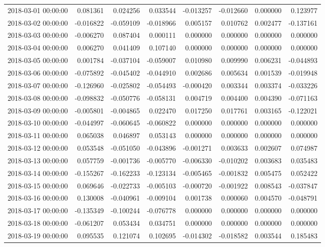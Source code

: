 \begin{tabular}{lrrrrrrr}
2018-03-01 00:00:00 & 0.081361 & 0.024256 & 0.033544 & -0.013257 & -0.012660 & 0.000000 & 0.123977 \\
2018-03-02 00:00:00 & -0.016822 & -0.059109 & -0.018966 & 0.005157 & 0.010762 & 0.002477 & -0.137161 \\
2018-03-03 00:00:00 & -0.006270 & 0.087404 & 0.000111 & 0.000000 & 0.000000 & 0.000000 & 0.000000 \\
2018-03-04 00:00:00 & 0.006270 & 0.041409 & 0.107140 & 0.000000 & 0.000000 & 0.000000 & 0.000000 \\
2018-03-05 00:00:00 & 0.001784 & -0.037104 & -0.059007 & 0.010980 & 0.009990 & 0.006231 & -0.044893 \\
2018-03-06 00:00:00 & -0.075892 & -0.045402 & -0.044910 & 0.002686 & 0.005634 & 0.001539 & -0.019948 \\
2018-03-07 00:00:00 & -0.126960 & -0.025802 & -0.054493 & -0.000420 & 0.003344 & 0.003374 & -0.033226 \\
2018-03-08 00:00:00 & -0.098832 & -0.050776 & -0.058131 & 0.004719 & 0.004400 & 0.004390 & -0.071163 \\
2018-03-09 00:00:00 & -0.005801 & -0.004865 & 0.022470 & 0.017250 & 0.017761 & 0.003165 & -0.122021 \\
2018-03-10 00:00:00 & -0.044997 & -0.060645 & -0.060822 & 0.000000 & 0.000000 & 0.000000 & 0.000000 \\
2018-03-11 00:00:00 & 0.065038 & 0.046897 & 0.053143 & 0.000000 & 0.000000 & 0.000000 & 0.000000 \\
2018-03-12 00:00:00 & 0.053548 & -0.051050 & -0.043896 & -0.001271 & 0.003633 & 0.002607 & 0.074987 \\
2018-03-13 00:00:00 & 0.057759 & -0.001736 & -0.005770 & -0.006330 & -0.010202 & 0.003683 & 0.035483 \\
2018-03-14 00:00:00 & -0.155267 & -0.162233 & -0.123134 & -0.005465 & -0.001832 & 0.005475 & 0.052422 \\
2018-03-15 00:00:00 & 0.069646 & -0.022733 & -0.005103 & -0.000720 & -0.001922 & 0.008543 & -0.037847 \\
2018-03-16 00:00:00 & 0.130008 & -0.040961 & -0.009104 & 0.001738 & 0.000060 & 0.004570 & -0.048791 \\
2018-03-17 00:00:00 & -0.135349 & -0.100244 & -0.076778 & 0.000000 & 0.000000 & 0.000000 & 0.000000 \\
2018-03-18 00:00:00 & -0.061207 & 0.053434 & 0.034751 & 0.000000 & 0.000000 & 0.000000 & 0.000000 \\
2018-03-19 00:00:00 & 0.095535 & 0.121074 & 0.102695 & -0.014302 & -0.018582 & 0.003544 & 0.185483 \\

\end{tabular}
